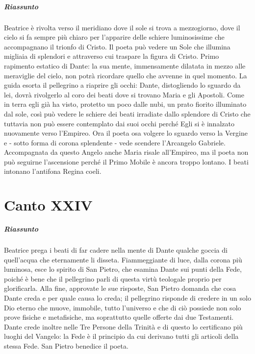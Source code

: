 \documentclass[a4paper, twoside, titlepage]{book}
\begin{document}
\paragraph{Riassunto} Beatrice è rivolta verso il meridiano dove il sole si trova a mezzogiorno, dove il cielo si fa sempre più chiaro per l’apparire delle schiere luminosissime che accompagnano il trionfo di Cristo. Il poeta può vedere un Sole che illumina migliaia di splendori e attraverso cui traspare la figura di Cristo. Primo rapimento estatico di Dante: la sua mente, immensamente dilatata in mezzo alle meraviglie del cielo, non potrà ricordare quello che avvenne in quel momento. La guida esorta il pellegrino a riaprire gli occhi: Dante, distogliendo lo sguardo da lei, dovrà rivolgerlo al coro dei beati dove si trovano Maria e gli Apostoli. Come in terra egli già ha visto, protetto un poco dalle nubi, un prato fiorito illuminato dal sole, così può vedere le schiere dei beati irradiate dallo splendore di Cristo che tuttavia non può essere contemplato dai suoi occhi perché Egli si è innalzato nuovamente verso l’Empireo. Ora il poeta osa volgere lo sguardo verso la Vergine e - sotto forma di corona splendente - vede scendere l’Arcangelo Gabriele. Accompagnata da questo Angelo anche Maria risale all’Empireo, ma il poeta non può seguirne l’ascensione perché il Primo Mobile è ancora troppo lontano. I beati intonano l’antifona Regina coeli.

\chapter{Canto XXIV}

\paragraph{Riassunto} Beatrice prega i beati di far cadere nella mente di Dante qualche goccia di quell’acqua che eternamente li disseta. Fiammeggiante di luce, dalla corona più luminosa, esce lo spirito di San Pietro, che esamina Dante sui punti della Fede, poiché è bene che il pellegrino parli di questa virtù teologale proprio per glorificarla. Alla fine, approvate le sue risposte, San Pietro domanda che cosa Dante creda e per quale causa lo creda; il pellegrino risponde di credere in un solo Dio eterno che muove, immobile, tutto l’universo e che di ciò possiede non solo prove fisiche e metafisiche, ma soprattutto quelle offerte dai due Testamenti. Dante crede inoltre nelle Tre Persone della Trinità e di questo lo certificano più luoghi del Vangelo: la Fede è il principio da cui derivano tutti gli articoli della stessa Fede. San Pietro benedice il poeta.
\end{document}
